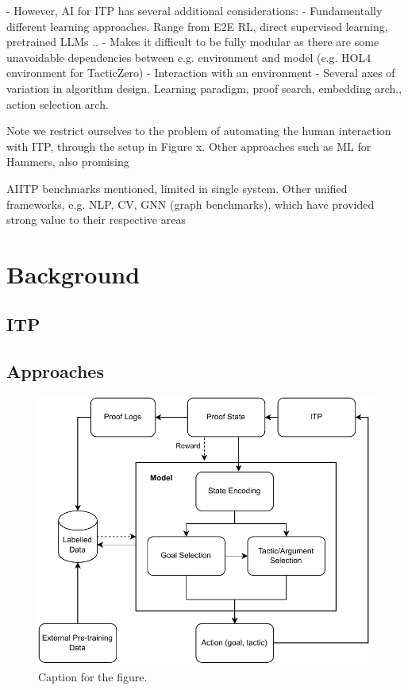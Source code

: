 \documentclass[letterpaper]{article} %
\begin{document}
- However, AI for ITP has several additional considerations:
- Fundamentally different learning approaches. Range from E2E RL, direct supervised learning, pretrained LLMs ..
- Makes it difficult to be fully modular as there are some unavoidable dependencies between e.g. environment and
model (e.g. HOL4 environment for TacticZero)
- Interaction with an environment
- Several axes of variation in algorithm design. Learning paradigm, proof search, embedding arch., action selection
arch.

Note we restrict ourselves to the problem of automating the human interaction with ITP, through the setup in Figure x.
Other approaches such as ML for Hammers, also promising

AIITP benchmarks mentioned, limited in single system.
Other unified frameworks, e.g. NLP, CV, GNN (graph benchmarks), which have provided strong value to their respective areas

\section{Background}
\subsection{ITP}
\subsection{Approaches}
\begin{figure}[h]
    \centering
    \includegraphics[width=\linewidth]{AI-ITP}
    \caption{Caption for the figure.}
    \label{fig:ai-itp}
\end{figure}
\end{document}
